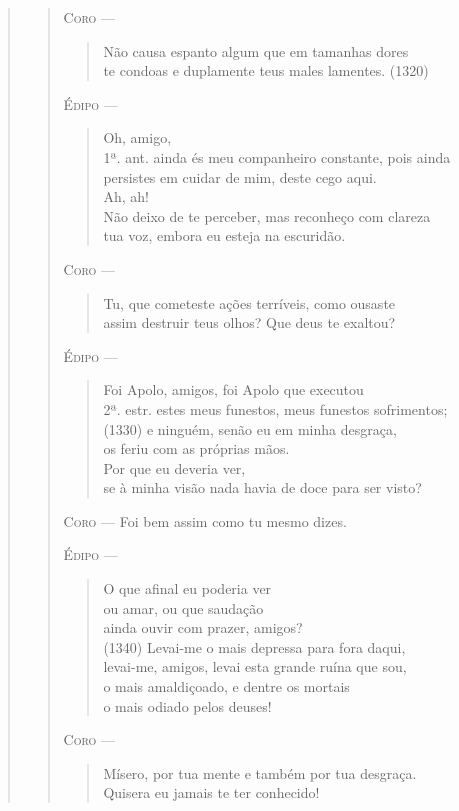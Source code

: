\begin{verse}
\begin{verse}
\textsc{Coro} --- \begin{verse}Não causa espanto algum que em tamanhas dores\\
te condoas e duplamente teus males lamentes. (1320)
\end{verse}

\textsc{Édipo} --- \begin{verse}Oh, amigo,\\ 1ª. ant.
ainda és meu companheiro constante, pois ainda\\
persistes em cuidar de mim, deste cego aqui.\\
Ah, ah!\\
Não deixo de te perceber, mas reconheço com clareza\\
tua voz, embora eu esteja na escuridão.
\end{verse}

\textsc{Coro} --- \begin{verse}Tu, que cometeste ações terríveis, como ousaste\\
assim destruir teus olhos? Que deus te exaltou?
\end{verse}

\textsc{Édipo} --- \begin{verse}Foi Apolo, amigos, foi Apolo que executou\\ 2ª. estr.
estes meus funestos, meus funestos sofrimentos;\\ (1330)
e ninguém, senão eu em minha desgraça,\\
os feriu com as próprias mãos.\\
Por que eu deveria ver,\\
se à minha visão nada havia de doce para ser visto?
\end{verse}

\textsc{Coro} --- Foi bem assim como tu mesmo dizes.

\textsc{Édipo} --- \begin{verse}O que afinal eu poderia ver\\
ou amar, ou que saudação\\
ainda ouvir com prazer, amigos?\\ (1340)
Levai-me o mais depressa para fora daqui,\\
levai-me, amigos, levai esta grande ruína que sou,\\
o mais amaldiçoado, e dentre os mortais\\
o mais odiado pelos deuses!
\end{verse}

\textsc{Coro} --- \begin{verse}Mísero, por tua mente e também por tua desgraça.\\
Quisera eu jamais te ter conhecido!
\end{verse}


\end{verse}
\end{verse}

